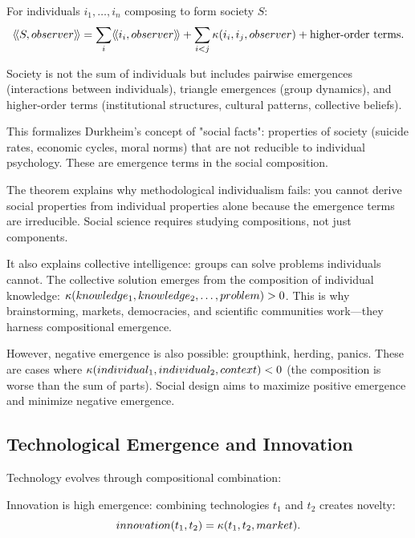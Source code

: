 \begin{theorem}
\label{thm:social-emergence}
For individuals $i_1, \ldots, i_n$ composing to form society $S$:
\[
  \langle\!\langle S, observer \rangle\!\rangle = \sum_i \langle\!\langle i_i, observer \rangle\!\rangle
  + \sum_{i<j} \kappa(i_i, i_j, observer)
  + \text{higher-order terms}.
\]
\end{theorem}

\begin{interpretation}
Society is not the sum of individuals but includes pairwise emergences (interactions
between individuals), triangle emergences (group dynamics), and higher-order
terms (institutional structures, cultural patterns, collective beliefs).

This formalizes Durkheim's concept of "social facts": properties of society
(suicide rates, economic cycles, moral norms) that are not reducible to individual
psychology. These are emergence terms in the social composition.

The theorem explains why methodological individualism fails: you cannot derive
social properties from individual properties alone because the emergence terms
are irreducible. Social science requires studying compositions, not just components.

It also explains collective intelligence: groups can solve problems individuals
cannot. The collective solution emerges from the composition of individual
knowledge: $\kappa(knowledge_1, knowledge_2, \ldots, problem) > 0$. This is
why brainstorming, markets, democracies, and scientific communities work---they
harness compositional emergence.

However, negative emergence is also possible: groupthink, herding, panics. These
are cases where $\kappa(individual_1, individual_2, context) < 0$ (the composition
is worse than the sum of parts). Social design aims to maximize positive
emergence and minimize negative emergence.
\end{interpretation}

\subsection{Technological Emergence and Innovation}

Technology evolves through compositional combination:

\begin{theorem}
\label{thm:technological-emergence}
Innovation is high emergence: combining technologies $t_1$ and $t_2$ creates
novelty:
\[
  innovation(t_1, t_2) = \kappa(t_1, t_2, market).
\]
\end{theorem}

